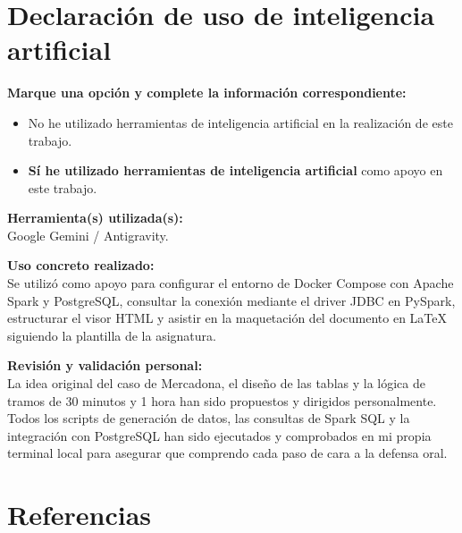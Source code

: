 \documentclass[a4paper,12pt]{article}
\begin{document}
\section{Declaración de uso de inteligencia artificial}

\textbf{Marque una opción y complete la información correspondiente:}

\begin{itemize}[label=$\square$,leftmargin=1.0cm]
  \item No he utilizado herramientas de inteligencia artificial en la realización de este trabajo.
  \item[\rlap{$\square$}{\raisebox{2pt}{\large\hspace{1pt}\textbf{X}}}] \textbf{Sí he utilizado herramientas de inteligencia artificial} como apoyo en este trabajo.
\end{itemize}

\textbf{Herramienta(s) utilizada(s):} \\
Google Gemini / Antigravity.

\textbf{Uso concreto realizado:} \\
Se utilizó como apoyo para configurar el entorno de Docker Compose con Apache Spark y PostgreSQL, consultar la conexión mediante el driver JDBC en PySpark, estructurar el visor HTML y asistir en la maquetación del documento en LaTeX siguiendo la plantilla de la asignatura.

\textbf{Revisión y validación personal:} \\
La idea original del caso de Mercadona, el diseño de las tablas y la lógica de tramos de 30 minutos y 1 hora han sido propuestos y dirigidos personalmente. Todos los scripts de generación de datos, las consultas de Spark SQL y la integración con PostgreSQL han sido ejecutados y comprobados en mi propia terminal local para asegurar que comprendo cada paso de cara a la defensa oral.

\section{Referencias}
\end{document}

